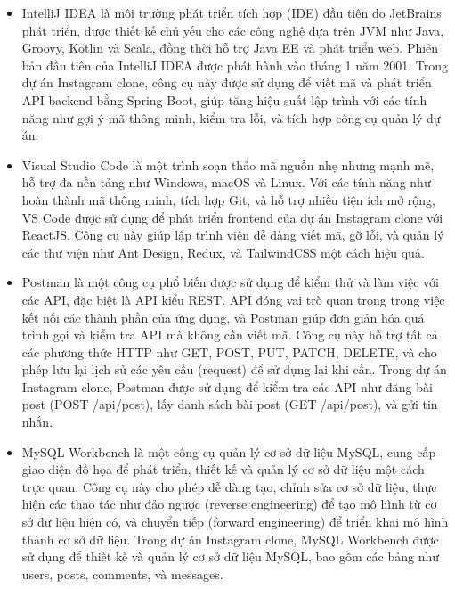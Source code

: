 \begin{itemize}
\item IntelliJ IDEA là môi trường phát triển tích hợp (IDE) đầu tiên do JetBrains phát triển, được thiết kế chủ yếu cho các công nghệ dựa trên JVM như Java, Groovy, Kotlin và Scala, đồng thời hỗ trợ Java EE và phát triển web. Phiên bản đầu tiên của IntelliJ IDEA được phát hành vào tháng 1 năm 2001. Trong dự án Instagram clone, công cụ này được sử dụng để viết mã và phát triển API backend bằng Spring Boot, giúp tăng hiệu suất lập trình với các tính năng như gợi ý mã thông minh, kiểm tra lỗi, và tích hợp công cụ quản lý dự án.
\end{itemize}


\begin{itemize}
\item Visual Studio Code là một trình soạn thảo mã nguồn nhẹ nhưng mạnh mẽ, hỗ trợ đa nền tảng như Windows, macOS và Linux. Với các tính năng như hoàn thành mã thông minh, tích hợp Git, và hỗ trợ nhiều tiện ích mở rộng, VS Code được sử dụng để phát triển frontend của dự án Instagram clone với ReactJS. Công cụ này giúp lập trình viên dễ dàng viết mã, gỡ lỗi, và quản lý các thư viện như Ant Design, Redux, và TailwindCSS một cách hiệu quả.
\end{itemize}

\begin{itemize}
\item Postman là một công cụ phổ biến được sử dụng để kiểm thử và làm việc với các API, đặc biệt là API kiểu REST. API đóng vai trò quan trọng trong việc kết nối các thành phần của ứng dụng, và Postman giúp đơn giản hóa quá trình gọi và kiểm tra API mà không cần viết mã. Công cụ này hỗ trợ tất cả các phương thức HTTP như GET, POST, PUT, PATCH, DELETE, và cho phép lưu lại lịch sử các yêu cầu (request) để sử dụng lại khi cần. Trong dự án Instagram clone, Postman được sử dụng để kiểm tra các API như đăng bài post (POST /api/post), lấy danh sách bài post (GET /api/post), và gửi tin nhắn.
\end{itemize}

\begin{itemize}
\item MySQL Workbench là một công cụ quản lý cơ sở dữ liệu MySQL, cung cấp giao diện đồ họa để phát triển, thiết kế và quản lý cơ sở dữ liệu một cách trực quan. Công cụ này cho phép dễ dàng tạo, chỉnh sửa cơ sở dữ liệu, thực hiện các thao tác như đảo ngược (reverse engineering) để tạo mô hình từ cơ sở dữ liệu hiện có, và chuyển tiếp (forward engineering) để triển khai mô hình thành cơ sở dữ liệu. Trong dự án Instagram clone, MySQL Workbench được sử dụng để thiết kế và quản lý cơ sở dữ liệu MySQL, bao gồm các bảng như users, posts, comments, và messages.
\end{itemize}

